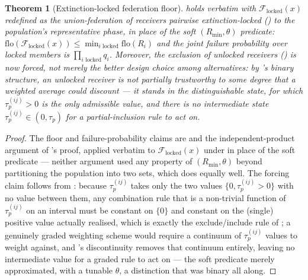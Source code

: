 \documentclass[11pt,twocolumn,a4paper]{article}
\theoremstyle{rdm}
\newtheorem{theorem}{Theorem}[section]
\theoremstyle{definition}
\theoremstyle{remark}
\newcommand{\flo}{\mathrm{flo}}
\newcommand{\Rec}{R}
\newcommand{\Fed}{\mathcal{F}}
\begin{document}
\begin{theorem}[Extinction-locked federation floor]
\label{thm:extinction-floor}
 holds verbatim with $\Fed_{\mathrm{locked}}(x)$
redefined as the union-federation of receivers pairwise extinction-locked
() to the population's representative phase, in
place of the soft $(R_{\min},\theta)$ predicate:
$\flo(\Fed_{\mathrm{locked}}(x))\le\min_{i\text{ locked}}\flo(\Rec_i)$ and
the joint failure probability over locked members is
$\prod_{i\text{ locked}}q_i$. Moreover, the exclusion of unlocked receivers
() is now \emph{forced}, not merely the better design
choice among alternatives: by 's binary
structure, an unlocked receiver is not partially trustworthy to some
degree that a weighted average could discount — it stands in the
distinguishable state, for which $\tau_p^{(ij)}>0$ is the only admissible
value, and there is no intermediate state $\tau_p^{(ij)}\in(0,\tau_p)$ for
a partial-inclusion rule to act on.
\end{theorem}

\begin{proof}
The floor and failure-probability claims are 
and the independent-product argument of 's proof,
applied verbatim to $\Fed_{\mathrm{locked}}(x)$ under
 in place of the soft predicate — neither
argument used any property of $(R_{\min},\theta)$ beyond partitioning the
population into two sets, which  does equally
well. The forcing claim follows from
: because $\tau_p^{(ij)}$ takes only the
two values $\{0,\tau_p^{(ij)}{>}0\}$ with no value between them, any
combination rule that is a non-trivial function of $\tau_p^{(ij)}$ on an
interval must be constant on $\{0\}$ and constant on the (single) positive
value actually realised, which is exactly the exclude/include rule of
; a genuinely graded weighting scheme would require a
continuum of $\tau_p^{(ij)}$ values to weight against, and
's discontinuity removes that continuum
entirely, leaving no intermediate value for a graded rule to act on — the
soft predicate merely approximated, with a tunable $\theta$, a distinction
that was binary all along.
\end{proof}
\end{document}
